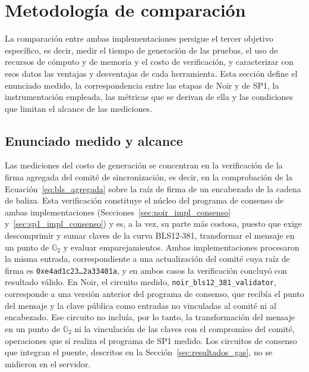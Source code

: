 \section{Metodología de comparación}
\label{sec:metodologia}

La comparación entre ambas implementaciones persigue el tercer objetivo específico, es decir,
medir el tiempo de generación de las pruebas, el uso de recursos de cómputo y de memoria y el costo
de verificación, y caracterizar con esos datos las ventajas y desventajas de cada herramienta.
Esta sección define el enunciado medido, la correspondencia entre las etapas de Noir y de SP1, la
instrumentación empleada, las métricas que se derivan de ella y las condiciones que limitan el
alcance de las mediciones.

\subsection{Enunciado medido y alcance}
\label{sec:metodologia_alcance}

Las mediciones del costo de generación se concentran en la verificación de la firma agregada del comité
de sincronización, es decir, en la comprobación de la Ecuación~\eqref{eq:bls_agregada} sobre la
raíz de firma de un encabezado de la cadena de baliza. Esta verificación constituye el núcleo del
programa de consenso de ambas implementaciones (Secciones~\ref{sec:noir_impl_consenso}
y~\ref{sec:sp1_impl_consenso}) y es, a la vez, su parte más costosa, puesto que exige descomprimir
y sumar claves de la curva BLS12-381, transformar el mensaje en un punto de $\mathbb{G}_2$ y
evaluar emparejamientos. Ambas implementaciones procesaron la misma entrada, correspondiente a una
actualización del comité cuya raíz de firma es
\texttt{0xe4ad1c23\ldots 2a33401a}, y en ambos casos la verificación concluyó con resultado
válido. En Noir, el circuito medido, \texttt{noir\_bls12\_381\_validator}, corresponde a una
versión anterior del programa de consenso, que recibía el punto del mensaje y la clave pública
como entradas no vinculadas al comité ni al encabezado. Ese circuito no incluía, por lo tanto, la
transformación del mensaje en un punto de $\mathbb{G}_2$ ni la vinculación de las claves con el
compromiso del comité, operaciones que sí realiza el programa de SP1 medido. Los circuitos de
consenso que integran el puente, descritos en la Sección~\ref{sec:resultados_gas}, no se midieron
en el servidor.

